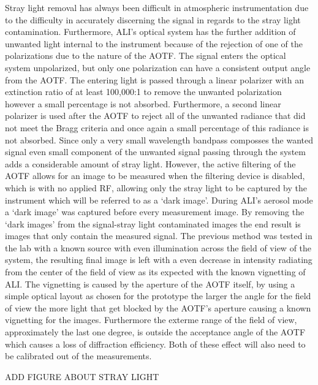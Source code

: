 Stray light removal has always been difficult in atmospheric instrumentation due to the difficulty in accurately discerning the signal in regards to the stray light contamination. Furthermore, ALI's optical system has the further addition of unwanted light internal to the instrument because of the rejection of one of the polarizations due to the nature of the AOTF. The signal enters the optical system unpolarized, but only one polarization can have a consistent output angle from the AOTF. The entering light is passed through a linear polarizer with an extinction ratio of at least 100,000:1 to remove the unwanted polarization however a small percentage is not absorbed. Furthermore, a second linear polarizer is used after the AOTF to reject all of the unwanted radiance that did not meet the Bragg criteria and once again a small percentage of this radiance is not absorbed. Since only a very small wavelength bandpass composses the wanted signal even small component of the unwanted signal passing through the system adds a considerable amount of stray light. However, the active filtering of the AOTF allows for an image to be measured when the filtering device is disabled, which is with no applied RF, allowing only the stray light to be captured by the instrument which will be referred to as a `dark image'. During ALI's aerosol mode a `dark image' was captured before every measurement image. By removing the `dark images' from the signal-stray light contaminated images the end result is images that only contain the measured signal. The previous method was tested in the lab with a known source with even illumination across the field of view of the system, the resulting final image is left with a even decrease in intensity radiating from the center of the field of view as its expected with the known vignetting of ALI. The vignetting is caused by the aperture of the AOTF itself, by using a simple optical layout as chosen for the prototype the larger the angle for the field of view the more light that get blocked by the AOTF's aperture causing a known vignetting for the images. Furthermore the exterme range of the field of view, approximately the last one degree, is outside the acceptance angle of the AOTF which causes a loss of diffraction efficiency. Both of these effect will also need to be calibrated out of the measurements.

ADD FIGURE ABOUT STRAY LIGHT

